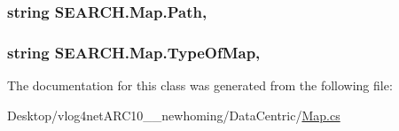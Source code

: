 \hypertarget{class_s_e_a_r_c_h_1_1_map_a64d3d4785e808bbc15781d2071ff8c3e}{
\subsubsection[{Path}]{\setlength{\rightskip}{0pt plus 5cm}string S\-E\-A\-R\-C\-H.\-Map.\-Path\hspace{0.3cm}{\ttfamily [get]}, {\ttfamily [set]}}}\label{class_s_e_a_r_c_h_1_1_map_a64d3d4785e808bbc15781d2071ff8c3e}
\hypertarget{class_s_e_a_r_c_h_1_1_map_afa651b1a6b9cc662d4c5b40513cf6906}{
\subsubsection[{Type\-Of\-Map}]{\setlength{\rightskip}{0pt plus 5cm}string S\-E\-A\-R\-C\-H.\-Map.\-Type\-Of\-Map\hspace{0.3cm}{\ttfamily [get]}, {\ttfamily [set]}}}\label{class_s_e_a_r_c_h_1_1_map_afa651b1a6b9cc662d4c5b40513cf6906}


The documentation for this class was generated from the following file\-:\begin{DoxyCompactItemize}
\item 
Desktop/vlog4net\-A\-R\-C10\-\_\-\_\-newhoming/\-Data\-Centric/\hyperlink{_map_8cs}{Map.\-cs}\end{DoxyCompactItemize}
